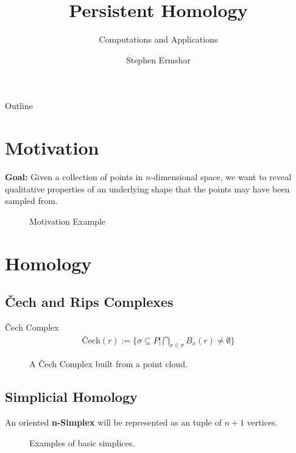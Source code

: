 

\title{Persistent Homology}
\subtitle{Computations and Applications}
\author{Stephen Ermshar}
\date{}






\begin{frame}
    \titlepage
\end{frame}

\begin{frame}{Outline}
	\tableofcontents
\end{frame}

\section[Motivation]{Motivation}
\begin{frame}
	\textbf{Goal:} Given a collection of points in \(n\)-dimensional space, we want to reveal qualitative properties of an underlying shape that the points may have been sampled from.

	\begin{figure}
		
		\caption{Motivation Example}
	\end{figure}
\end{frame}

\section[Homology]{Homology}
\subsection{\v{C}ech and Rips Complexes}
\begin{frame}
	\begin{block}{\v{C}ech Complex}
		\begin{align*}
			\textrm{\v{C}ech}(r) := \{ \sigma \subseteq P | \bigcap_{x\in \sigma} B_x(r) \neq \emptyset \}
		\end{align*}
		\cite{wagner}
	\end{block}
	\begin{figure}
		
		\caption{A \v{C}ech Complex built from a point cloud.}
	\end{figure}
\end{frame}

\subsection{Simplicial Homology}
\begin{frame}
	\begin{definition}
		An oriented \textbf{n-Simplex} will be represented as an tuple of \(n+1\) vertices.
	\end{definition}
	\begin{figure}
		
		\caption{Examples of basic simplices.}
	\end{figure}
\end{frame}

